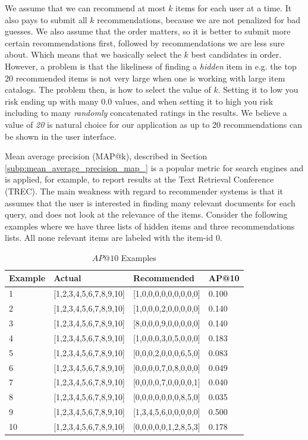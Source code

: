 We assume that we can recommend at most $k$ items for each user at a time. It also pays to submit all $k$
recommendations, because we are not penalized for bad guesses. We also assume that the order matters, so it
is better to submit more certain recommendations first, followed by recommendations we are less sure about.
Which means that we basically select the $k$ best candidates in order.
However, a problem is that the likeliness of finding a \emph{hidden} item in e.g. the top 20 recommended items
is not very large when one is working with large item catalogs. The problem then, is how to select the value of $k$.
Setting it to low you risk ending up with many $0.0$ values, and when setting it to high you risk including to many
\emph{randomly} concatenated ratings in the results. We believe a value of \textit{20} is natural choice for our
application as up to 20 recommendations can be shown in the user interface.

Mean average precision (MAP@k), described in Section \ref{subp:mean_average_precision_map_} is a popular metric for search
engines and is applied, for example, to report results at the Text Retrieval Conference (TREC). The main weakness with regard
to recommender systems is that it assumes that the user is interested in finding many relevant documents for each query, and
does not look at the relevance of the items. Consider the following examples where we have three lists of hidden items and
three recommendations lists. All none relevant items are labeled with the item-id $0$.

\begin{table}[H]
\label{table:ap}
\centering
\begin{tabular}{*{4}l}
\toprule
Example 	& 	Actual					& 	Recommended					&	AP@10   \\ \midrule
1			& [1,2,3,4,5,6,7,8,9,10]	&	[1,0,0,0,0,0,0,0,0,0]		&	0.100  \\
2			& [1,2,3,4,5,6,7,8,9,10]	&	[1,0,0,0,2,0,0,0,0,0]		&	0.140  \\
3			& [1,2,3,4,5,6,7,8,9,10]	&	[8,0,0,0,9,0,0,0,0,0]		&	0.140  \\
4			& [1,2,3,4,5,6,7,8,9,10]	&	[1,0,0,0,3,0,5,0,0,0]		&	0.183  \\
5			& [1,2,3,4,5,6,7,8,9,10]	&	[0,0,0,2,0,0,0,6,5,0]		&	0.083  \\
6			& [1,2,3,4,5,6,7,8,9,10]	&	[0,0,0,0,7,0,8,0,0,0]		&	0.049  \\
7			& [1,2,3,4,5,6,7,8,9,10]	&	[0,0,0,0,7,0,0,0,0,1]		&	0.040  \\
8			& [1,2,3,4,5,6,7,8,9,10]	&	[0,0,0,0,0,0,0,8,5,0]		&	0.035  \\
9			& [1,2,3,4,5,6,7,8,9,10]	&	[1,3,4,5,6,0,0,0,0,0]		&	0.500  \\
10			& [1,2,3,4,5,6,7,8,9,10]	&	[0,0,0,0,0,1,2,8,5,3]		&	0.178  \\
\bottomrule
\end{tabular}
\caption{$AP@10$ Examples}
\end{table}

